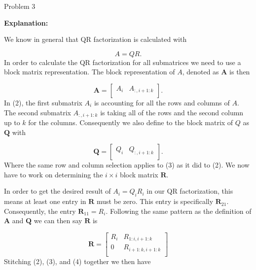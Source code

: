 \begin{problem}{Problem 3}
\begin{highlight}[Solution]
        \noindent \textbf{Explanation:} \vspace*{1em}

        We know in general that QR factorization is calculated with 

        \begin{equation}
            A = QR.
        \end{equation}
        In order to calculate the QR factorization for all submatrices we need to use a block matrix representation. The block representation of $A$, denoted as $\mathbf{A}$ is then 

        \begin{equation}
            \mathbf{A} = 
            \begin{bmatrix}
                A_{i} & A_{:,i+1:k} \\
            \end{bmatrix}.
        \end{equation}
        In (2), the first submatrix $A_{i}$ is accounting for all the rows and columns of $A$. The second submatrix $A_{:,i+1:k}$ is taking all of the rows and the second column up to $k$ for the columns.
        Consequently we also define to the block matrix of $Q$ as $\mathbf{Q}$ with 

        \begin{equation}
            \mathbf{Q} = 
            \begin{bmatrix}
                Q_{i} & Q_{:,i+1:k} \\
            \end{bmatrix}.
        \end{equation}
        Where the same row and column selection applies to (3) as it did to (2). We now have to work on determining the $i \times i$ block matrix $\mathbf{R}$. 

        In order to get the desired result of $A_{i} = Q_{i}R_{i}$ in our QR factorization, this means at least one entry in $\mathbf{R}$ must be zero. This entry is specifically $\mathbf{R}_{21}$.
        Consequently, the entry $\mathbf{R}_{11} = R_{i}$. Following the same pattern as the definition of $\mathbf{A}$ and $\mathbf{Q}$ we can then say $\mathbf{R}$ is

        \begin{equation}
            \mathbf{R} = 
            \begin{bmatrix}
                R_{i} & R_{1:i,i+1:k} \\
                0 & R_{i+1:k,i+1:k} \\
            \end{bmatrix}
        \end{equation}
        Stitching (2), (3), and (4) together we then have 


\end{highlight}
\end{problem}
